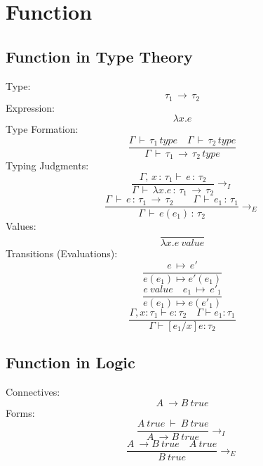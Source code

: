 \documentclass{article}
\begin{document}
\section{Function}

\subsection*{Function in Type Theory}
Type: 
\begin{equation*}
\tau_{1}\,\rightarrow\,\tau_{2}
\end{equation*}
Expression: 
\begin{equation*}
\lambda x.e
\end{equation*}
Type Formation: 
\begin{equation*}
\frac{\Gamma\,\vdash\,\tau_{1}\,type\quad\Gamma\,\vdash\,\tau_{2}\,type}
{\Gamma\,\vdash\,\tau_{1}\,\rightarrow\,\tau_{2}\,type}
\end{equation*}
Typing Judgments:
\begin{equation*}
\frac{\Gamma,\,x\,:\,\tau_{1}\vdash\,e\,:\,\tau_{2}}
{\Gamma\,\vdash\,\lambda x.e\,:\,\tau_{1}\,\rightarrow\,\tau_{2}}\rightarrow_{I}
\end{equation*}
\begin{equation*}
\frac{\Gamma\,\vdash\,e\,:\,\tau_{1}\,\rightarrow\,\tau_{2}
	\qquad\Gamma\,\vdash\,e_{1}\,:\,\tau_{1}}
{\Gamma\,\vdash\,e(e_{1})\,:\,\tau_{2}}
\rightarrow_{E}
\end{equation*}
Values:
\begin{equation*}
\frac{}
{\lambda x.e\ value}
\end{equation*}
Transitions (Evaluations):
\begin{equation*}
\frac{e\,\mapsto\,e'}
{e(e_{1}) \mapsto e'(e_{1})}
\end{equation*}
\begin{equation*}
\frac{e\ value\quad e_{1}\,\mapsto\,e'_{1}}
{e(e_{1}) \mapsto e(e'_{1})}
\end{equation*}
\begin{equation*}
\frac{\Gamma, x: \tau_{1} \vdash e: \tau_{2} \quad \Gamma \vdash e_{1}:\tau_{1}}
{\Gamma \vdash [e_{1}/x] e : \tau_{2}}
\end{equation*}

\subsection*{Function in Logic}
Connectives:
\begin{equation*}
A \ \rightarrow B\ true
\end{equation*}
Forms:
\begin{equation*}
\frac{A\ true\ \vdash\ B\ true}
{A \ \rightarrow B\ true}\rightarrow_{I}
\end{equation*}
\begin{equation*}
\frac{A \ \rightarrow B\ true\quad A\ true}
{B\ true}\rightarrow_{E}
\end{equation*}
\end{document}
